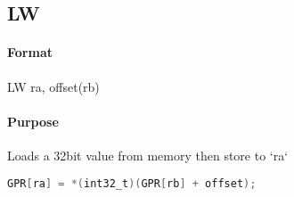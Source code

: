 \subsection{LW}


\paragraph{Format} LW ra, offset(rb)

\paragraph{Purpose} Loads a 32bit value from memory then store to `ra`

\begin{lstlisting}[language=C]
    GPR[ra] = *(int32_t)(GPR[rb] + offset);
\end{lstlisting}
